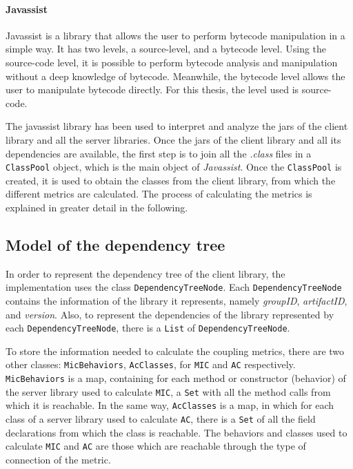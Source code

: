 \paragraph{Javassist}
Javassist is a library that allows the user to perform bytecode manipulation in a simple way. It has two levels, a source-level, and a bytecode level. Using the source-code level, it is possible to perform bytecode analysis and manipulation without a deep knowledge of bytecode. Meanwhile, the bytecode level allows the user to manipulate bytecode directly.
For this thesis, the level used is source-code.

The javassist library has been used to interpret and analyze the jars of the client library and all the server libraries. Once the jars of the client library and all its dependencies are available, the first step is to join all the \textit{.class} files in a \texttt{ClassPool} object, which is the main object of \textit{Javassist}. Once the \texttt{ClassPool} is created, it is used to obtain the classes from the client library, from which the different metrics are calculated. The process of calculating the metrics is explained in greater detail in the following.

\subsection{Model of the dependency tree}
In order to represent the dependency tree of the client library, the implementation uses the class \texttt{DependencyTreeNode}. Each \texttt{DependencyTreeNode} contains the information of the library it represents, namely \textit{groupID}, \textit{artifactID}, and \textit{version}. Also, to represent the dependencies of the library represented by each  \texttt{DependencyTreeNode}, there is a \texttt{List} of \texttt{DependencyTreeNode}.

To store the information needed to calculate the coupling metrics, there are two other classes: \texttt{MicBehaviors}, \texttt{AcClasses}, for \texttt{MIC} and \texttt{AC} respectively. \texttt{MicBehaviors} is a map, containing for each method or constructor (behavior) of the server library used to calculate \texttt{MIC}, a \texttt{Set} with all the method calls from which it is reachable. In the same way, \texttt{AcClasses} is a map, in which for each class of a server library used to calculate \texttt{AC}, there is a \texttt{Set} of all the field declarations from which the class is reachable. The behaviors and classes used to calculate \texttt{MIC} and \texttt{AC} are those which are reachable through the type of connection of the metric.


